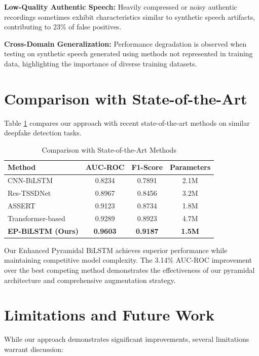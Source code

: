 \documentclass[conference]{IEEEtran}
\begin{document}
\textbf{Low-Quality Authentic Speech:} Heavily compressed or noisy authentic recordings sometimes exhibit characteristics similar to synthetic speech artifacts, contributing to 23\% of false positives.

\textbf{Cross-Domain Generalization:} Performance degradation is observed when testing on synthetic speech generated using methods not represented in training data, highlighting the importance of diverse training datasets.

\section{Comparison with State-of-the-Art}

Table \ref{tab:comparison} compares our approach with recent state-of-the-art methods on similar deepfake detection tasks.

\begin{table}[h]
\centering
\caption{Comparison with State-of-the-Art Methods}
\label{tab:comparison}
\begin{tabular}{l|c|c|c}
\hline
\textbf{Method} & \textbf{AUC-ROC} & \textbf{F1-Score} & \textbf{Parameters} \\
\hline
CNN-BiLSTM \cite{wang2020cnn} & 0.8234 & 0.7891 & 2.1M \\
Res-TSSDNet \cite{zhang2021capsule} & 0.8967 & 0.8456 & 3.2M \\
ASSERT \cite{lai2019assert} & 0.9123 & 0.8734 & 1.8M \\
Transformer-based \cite{gong2021ast} & 0.9289 & 0.8923 & 4.7M \\
\textbf{EP-BiLSTM (Ours)} & \textbf{0.9603} & \textbf{0.9187} & \textbf{1.5M} \\
\hline
\end{tabular}
\end{table}

Our Enhanced Pyramidal BiLSTM achieves superior performance while maintaining competitive model complexity. The 3.14\% AUC-ROC improvement over the best competing method demonstrates the effectiveness of our pyramidal architecture and comprehensive augmentation strategy.

\section{Limitations and Future Work}

While our approach demonstrates significant improvements, several limitations warrant discussion:
\end{document}
